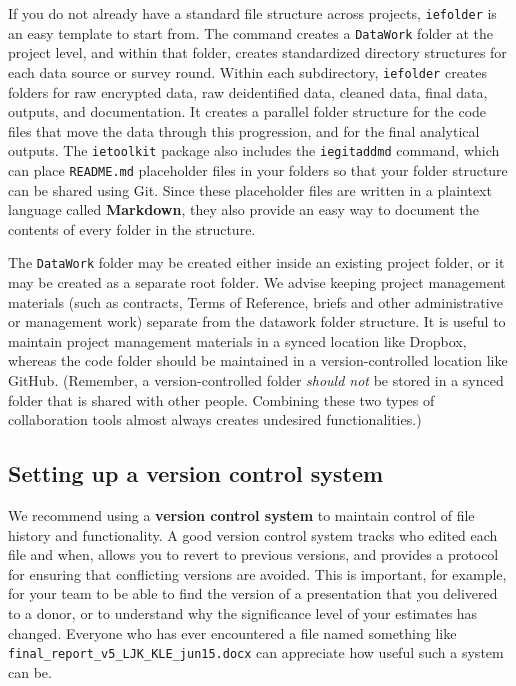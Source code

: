 If you do not already have a standard file structure across projects,
\texttt{iefolder} is an easy template to start from.
The command creates a \texttt{DataWork} folder at the project level,
and within that folder, creates standardized directory structures
for each data source or survey round.
Within each subdirectory, \texttt{iefolder} creates folders for raw encrypted data,
raw deidentified data, cleaned data, final data, outputs, and documentation.
It creates a parallel folder structure for the code files
that move the data through this progression,
and for the final analytical outputs.
The \texttt{ietoolkit} package also includes the \texttt{iegitaddmd} command,
which can place \texttt{README.md} placeholder files in your folders so that
your folder structure can be shared using Git.
Since these placeholder files are written in a plaintext language called \textbf{Markdown},
they also provide an easy way to document the contents of every folder in the structure.

The \texttt{DataWork} folder may be created either inside
an existing project folder, or it may be created as a separate root folder.
We advise keeping project management materials
(such as contracts, Terms of Reference, briefs and other administrative or management work)
separate from the datawork folder structure.
It is useful to maintain project management materials in a synced location like Dropbox,
whereas the code folder should be maintained in a version-controlled location like GitHub.
(Remember, a version-controlled folder \textit{should not}
be stored in a synced folder that is shared with other people.
Combining these two types of collaboration tools
almost always creates undesired functionalities.)

\subsection{Setting up a version control system}
We recommend using a \textbf{version control system} to
maintain control of file history and functionality.
A good version control system tracks who edited each file and when,
allows you to revert to previous versions,
and provides a protocol for ensuring that conflicting versions are avoided.
This is important, for example, for your team
to be able to find the version of a presentation that you delivered to a donor,
or to understand why the significance level of your estimates has changed.
Everyone who has ever encountered a file named something like \texttt{final\_report\_v5\_LJK\_KLE\_jun15.docx}
can appreciate how useful such a system can be.

